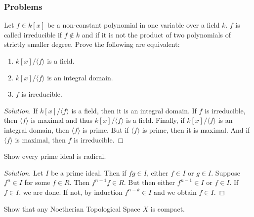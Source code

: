 \documentclass[crop=false,class=article,oneside]{standalone}
\begin{document}
        \subsubsection{Problems}
            \begin{problem}
                Let $f\in k[x]$ be a non-constant polynomial
                in one variable over a field $k$. $f$ is called
                irreducible if $f\notin k$ and if it is not
                the product of two polynomials of strictly smaller
                degree. Prove the following are equivalent:
                \begin{enumerate}
                    \item $k[x]/\langle f\rangle$ is a field.
                    \item $k[x]/\langle f\rangle$ is an
                          integral domain.
                    \item $f$ is irreducible.
                \end{enumerate}
            \end{problem}
            \begin{proof}[Solution]
                If $k[x]/\langle f\rangle$ is a field,
                then it is an integral domain. If $f$ is
                irreducible, then $\langle f\rangle$ is
                maximal and thus $k[x]/\langle f\rangle$ is
                a field. Finally, if $k[x]/\langle f\rangle$ is
                an integral domain, then $\langle f\rangle$ is
                prime. But if $\langle f\rangle$ is prime,
                then it is maximal. And if $\langle f\rangle$
                is maximal, then $f$ is irreducible. 
            \end{proof}
            \begin{problem}
                Show every prime ideal is radical.
            \end{problem}
            \begin{proof}[Solution]
                Let $I$ be a prime ideal. Then if $fg\in I$,
                either $f\in I$ or $g\in I$. Suppose $f^n \in I$
                for some $f\in R$. Then $f^{n-1}f \in R$.
                But then either $f^{n-1} \in I$ or $f\in I$.
                If $f\in I$, we are done. If not, by induction
                $f^{n-k} \in I$ and we obtain $f\in I$.
            \end{proof}
            \begin{problem}
                Show that any Noetherian
                Topological Space $X$ is compact.
            \end{problem}
\end{document}
